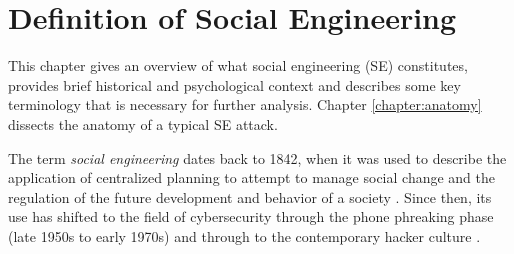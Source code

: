 

    

\chapter{Definition of Social Engineering\label{definition}}
\begin{comment}

Guides:
    - Page limit 1-2 pages
    - Context and terminology (käsitteet), challenges and measurement criteria, values, research question analysis
    - Second to last paragraph contains the research question (RQ) and the results

TODO:
    [ ] Who is this thesis for
    [ ] Why should you read my thesis
    [ ] What is the research question and how it is answered
    [ ] How is this thesis organized, what is covered and what is deliberaly not covered and in what chapters (outline)

What to cover:
    - What is cybersecurity and why it's of paramount importance
    - What is social engineering
        - Brief history of social engineering
            - Phishing in 1996 via AOL
    - Attacks, classical social engineering attacks
        - Phishing, vishing, smishing
        - Tailgating
        - Baiting (not always considered SE)
        - Dumpster diving (not always considered SE)
    - Countermeasures, classical
        - User awareness & training programs
        - Company policy & company culture
        - Real-time threat detection
        - Vulnerability detection
    - Typical challenges
    - Motives for cybercrimes
        - Hard(er) to detect?
        - "Easy" wins?

Literature:
    - Defining Social Engineering in Cybersecurity

\end{comment}

This chapter gives an overview of what social engineering (SE) constitutes, provides brief historical and psychological context and describes some key terminology that is necessary for further analysis. Chapter \ref{chapter:anatomy} dissects the anatomy of a typical SE attack.


The term \textit{social engineering} dates back to 1842, when it was used to describe the application of centralized planning to attempt to manage social change and the regulation of the future development and behavior of a society \citep{hatfieldSocialEngineeringCybersecurity2018a}. Since then, its use has shifted to the field of cybersecurity through the phone phreaking phase (late 1950s to early 1970s) and through to the contemporary hacker culture \citep{wangDefiningSocialEngineering2020}.


